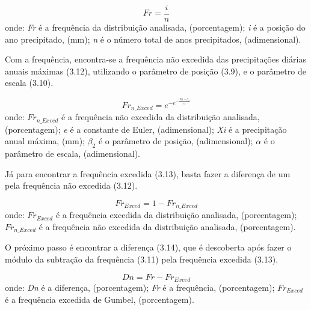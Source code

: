 \begin{equation}
Fr = \frac{i}{n}
\end{equation}
\newline
onde:
\newline
\textit{Fr} é a frequência da distribuição analisada, (porcentagem);
\newline
\textit{i} é a posição do ano precipitado, (mm);
\newline
\textit{n} é o número total de anos precipitados, (adimensional).\bigskip

Com a frequência, encontra-se a frequência não excedida das precipitações diárias anuais máximas (3.12), utilizando o parâmetro de posição (3.9), e o parâmetro de escala (3.10).\bigskip

\begin{equation}
Fr_{n\_Exced} = e^{- e^{- \frac{Xi - \beta_2}{\alpha}}}
\end{equation}
\newline
onde:
\newline
$Fr_{n\_Exced}$ é a frequência não excedida da distribuição analisada, (porcentagem);
\newline
\textit{e} é a constante de Euler, (adimensional);
\newline
\textit{Xi} é a precipitação anual máxima, (mm);
\newline
$\beta_2$ é o parâmetro de posição, (adimensional);
\newline
$\alpha$ é o parâmetro de escala, (adimensional).\bigskip

Já para encontrar a frequência excedida (3.13), basta fazer a diferença de um pela frequência não excedida (3.12).

\begin{equation}
Fr_{Exced} = 1 - Fr_{n\_Exced}
\end{equation}
\newline
onde:
\newline
$Fr_{Exced}$ é a frequência excedida da distribuição analisada, (porcentagem);
\newline
$Fr_{n\_Exced}$ é a frequência não excedida da distribuição analisada, (porcentagem).\bigskip

O próximo passo é encontrar a diferença (3.14), que é descoberta após fazer o módulo da subtração da frequência (3.11) pela frequência excedida (3.13).\bigskip

\begin{equation}
Dn = Fr - Fr_{Exced}
\end{equation}
\newline
onde:
\newline
\textit{Dn} é a diferença, (porcentagem);
\newline
\textit{Fr} é a frequência, (porcentagem);
\newline
$Fr_{Exced}$ é a frequência excedida de Gumbel, (porcentagem).\bigskip

